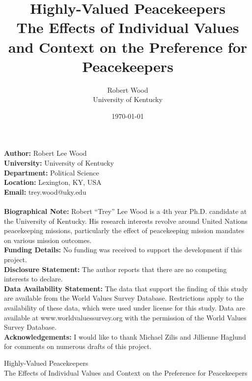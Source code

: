 \documentclass[12pt]{article}
\title{Highly-Valued Peacekeepers \\
\large The Effects of Individual Values and Context on the Preference for Peacekeepers}
\author{Robert Wood \\
University of Kentucky}
\date{\today}
\begin{document}

\begin{titlingpage}
\maketitle

\noindent \textbf{Author:} Robert Lee Wood \\
\textbf{University:} University of Kentucky \\
\textbf{Department:} Political Science \\
\textbf{Location:} Lexington, KY, USA \\
\textbf{Email:} trey.wood@uky.edu \\
\\
\textbf{Biographical Note:} Robert ``Trey'' Lee Wood is a 4th year Ph.D. candidate at the University of Kentucky. His research interests revolve around United Nations peacekeeping missions, particularly the effect of peacekeeping mission mandates on various mission outcomes. \\
\textbf{Funding Details:} No funding was received to support the development if this project. \\
\textbf{Disclosure Statement:} The author reports that there are no competing interests to declare. \\
\textbf{Data Availability Statement:} The data that support the finding of this study are available from the World Values Survey Database. Restrictions apply to the availability of these data, which were used under license for this study. Data are available at www.worldvaluessurvey.org with the permission of the World Values Survey Database. \\
\textbf{Acknowledgements:} I would like to thank Michael Zilis and Jillienne Haglund for comments on numerous drafts of this project.

\end{titlingpage}

\clearpage


\begin{center}
{\LARGE Highly-Valued Peacekeepers} \\
The Effects of Individual Values and Context on the Preference for Peacekeepers
\end{center}
\end{document}

